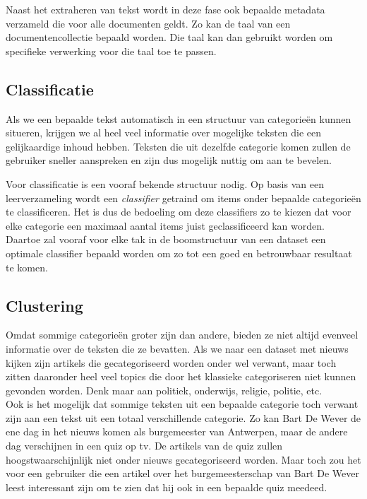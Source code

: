 Naast het extraheren van tekst wordt in deze fase ook bepaalde metadata verzameld die voor alle documenten geldt. Zo kan de taal van een documentencollectie bepaald worden. Die taal kan dan gebruikt worden om specifieke verwerking voor die taal toe te passen. 

\subsection{Classificatie}
Als we een bepaalde tekst automatisch in een structuur van categorie\"en kunnen situeren, krijgen we al heel veel informatie over mogelijke teksten die een gelijkaardige inhoud hebben. Teksten die uit dezelfde categorie komen zullen de gebruiker sneller aanspreken en zijn dus mogelijk nuttig om aan te bevelen. 

Voor classificatie is een vooraf bekende structuur nodig. Op basis van een leerverzameling wordt een \textit{classifier} getraind om items onder bepaalde categorie\"en te classificeren. Het is dus de bedoeling om deze classifiers zo te kiezen dat voor elke categorie een maximaal aantal items juist geclassificeerd kan worden. Daartoe zal vooraf voor elke tak in de boomstructuur van een dataset een optimale classifier bepaald worden om zo tot een goed en betrouwbaar resultaat te komen.

\subsection{Clustering}
Omdat sommige categorie\"en groter zijn dan andere, bieden ze niet altijd evenveel informatie over de teksten die ze bevatten. Als we naar een dataset met nieuws kijken zijn artikels die gecategoriseerd worden onder  wel verwant, maar toch zitten daaronder heel veel topics die door het klassieke categoriseren niet kunnen gevonden worden. Denk maar aan politiek, onderwijs, religie, politie, etc.
\\Ook is het mogelijk dat sommige teksten uit een bepaalde categorie toch verwant zijn aan een tekst uit een totaal verschillende categorie. Zo kan Bart De Wever de ene dag in het nieuws komen als burgemeester van Antwerpen, maar de andere dag verschijnen in een quiz op tv. De artikels van de quiz zullen hoogstwaarschijnlijk niet onder nieuws gecategoriseerd worden. Maar toch zou het voor een gebruiker die een artikel over het burgemeesterschap van Bart De Wever leest interessant zijn om te zien dat hij ook in een bepaalde quiz meedeed. 

